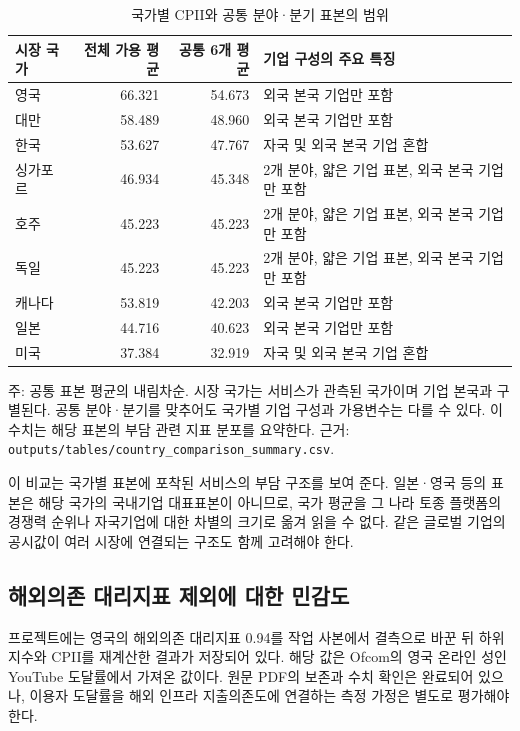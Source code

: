 \documentclass[11pt,a4paper]{report}
\begin{document}
\begin{table}[H]
\centering\small
\caption{국가별 CPII와 공통 분야·분기 표본의 범위}
\label{tab:country_scope_revision}
\begin{tabular}{L{2.0cm}rrL{7.0cm}}
\toprule
{}
시장 국가 & 전체 가용 평균 & 공통 6개 평균 & 기업 구성의 주요 특징 \\
\midrule
영국 & 66.321 & 54.673 & 외국 본국 기업만 포함 \\
대만 & 58.489 & 48.960 & 외국 본국 기업만 포함 \\
한국 & 53.627 & 47.767 & 자국 및 외국 본국 기업 혼합 \\
싱가포르 & 46.934 & 45.348 & 2개 분야, 얇은 기업 표본, 외국 본국 기업만 포함 \\
호주 & 45.223 & 45.223 & 2개 분야, 얇은 기업 표본, 외국 본국 기업만 포함 \\
독일 & 45.223 & 45.223 & 2개 분야, 얇은 기업 표본, 외국 본국 기업만 포함 \\
캐나다 & 53.819 & 42.203 & 외국 본국 기업만 포함 \\
일본 & 44.716 & 40.623 & 외국 본국 기업만 포함 \\
미국 & 37.384 & 32.919 & 자국 및 외국 본국 기업 혼합 \\
\bottomrule
\end{tabular}
{\par\raggedright\footnotesize 주: 공통 표본 평균의 내림차순. 시장 국가는 서비스가 관측된 국가이며 기업 본국과 구별된다. 공통 분야·분기를 맞추어도 국가별 기업 구성과 가용변수는 다를 수 있다. 이 수치는 해당 표본의 부담 관련 지표 분포를 요약한다. 근거: \nolinkurl{outputs/tables/country_comparison_summary.csv}.\par}
\end{table}

이 비교는 국가별 표본에 포착된 서비스의 부담 구조를 보여 준다. 일본·영국 등의 표본은 해당 국가의 국내기업 대표표본이 아니므로, 국가 평균을 그 나라 토종 플랫폼의 경쟁력 순위나 자국기업에 대한 차별의 크기로 옮겨 읽을 수 없다. 같은 글로벌 기업의 공시값이 여러 시장에 연결되는 구조도 함께 고려해야 한다.


\subsection{해외의존 대리지표 제외에 대한 민감도}
프로젝트에는 영국의 해외의존 대리지표 0.94를 작업 사본에서 결측으로 바꾼 뒤 하위지수와 CPII를 재계산한 결과가 저장되어 있다. 해당 값은 Ofcom의 영국 온라인 성인 YouTube 도달률에서 가져온 값이다. 원문 PDF의 보존과 수치 확인은 완료되어 있으나, 이용자 도달률을 해외 인프라 지출의존도에 연결하는 측정 가정은 별도로 평가해야 한다.
\end{document}
